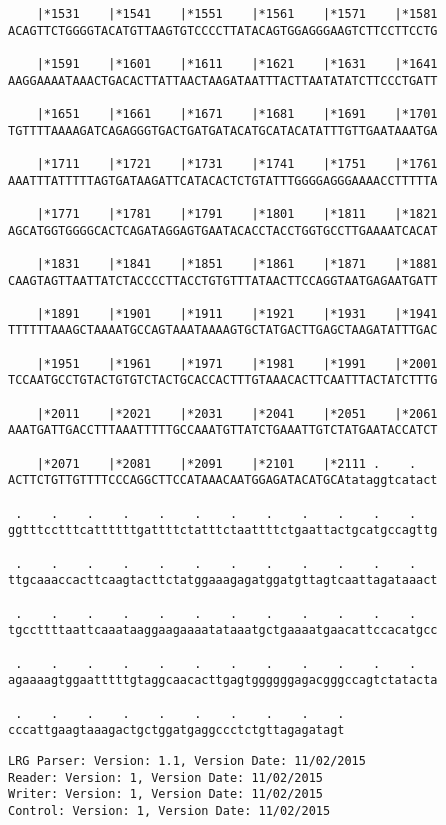 \documentclass{article}
\begin{document}
\begin{Verbatim}
    |*1531    |*1541    |*1551    |*1561    |*1571    |*1581
ACAGTTCTGGGGTACATGTTAAGTGTCCCCTTATACAGTGGAGGGAAGTCTTCCTTCCTG
  
    |*1591    |*1601    |*1611    |*1621    |*1631    |*1641
AAGGAAAATAAACTGACACTTATTAACTAAGATAATTTACTTAATATATCTTCCCTGATT
  
    |*1651    |*1661    |*1671    |*1681    |*1691    |*1701
TGTTTTAAAAGATCAGAGGGTGACTGATGATACATGCATACATATTTGTTGAATAAATGA
  
    |*1711    |*1721    |*1731    |*1741    |*1751    |*1761
AAATTTATTTTTAGTGATAAGATTCATACACTCTGTATTTGGGGAGGGAAAACCTTTTTA
  
    |*1771    |*1781    |*1791    |*1801    |*1811    |*1821
AGCATGGTGGGGCACTCAGATAGGAGTGAATACACCTACCTGGTGCCTTGAAAATCACAT
  
    |*1831    |*1841    |*1851    |*1861    |*1871    |*1881
CAAGTAGTTAATTATCTACCCCTTACCTGTGTTTATAACTTCCAGGTAATGAGAATGATT
  
    |*1891    |*1901    |*1911    |*1921    |*1931    |*1941
TTTTTTAAAGCTAAAATGCCAGTAAATAAAAGTGCTATGACTTGAGCTAAGATATTTGAC
  
    |*1951    |*1961    |*1971    |*1981    |*1991    |*2001
TCCAATGCCTGTACTGTGTCTACTGCACCACTTTGTAAACACTTCAATTTACTATCTTTG
  
    |*2011    |*2021    |*2031    |*2041    |*2051    |*2061
AAATGATTGACCTTTAAATTTTTGCCAAATGTTATCTGAAATTGTCTATGAATACCATCT
  
    |*2071    |*2081    |*2091    |*2101    |*2111 .    .   
ACTTCTGTTGTTTTCCCAGGCTTCCATAAACAATGGAGATACATGCAtataggtcatact
  
 .    .    .    .    .    .    .    .    .    .    .    .   
ggtttcctttcattttttgattttctatttctaattttctgaattactgcatgccagttg
  
 .    .    .    .    .    .    .    .    .    .    .    .   
ttgcaaaccacttcaagtacttctatggaaagagatggatgttagtcaattagataaact
  
 .    .    .    .    .    .    .    .    .    .    .    .   
tgccttttaattcaaataaggaagaaaatataaatgctgaaaatgaacattccacatgcc
  
 .    .    .    .    .    .    .    .    .    .    .    .   
agaaaagtggaatttttgtaggcaacacttgagtggggggagacgggccagtctatacta
  
 .    .    .    .    .    .    .    .    .    .
cccattgaagtaaagactgctggatgaggccctctgttagagatagt
\end{Verbatim}
\newpage
\begin{Verbatim}
LRG Parser: Version: 1.1, Version Date: 11/02/2015
Reader: Version: 1, Version Date: 11/02/2015
Writer: Version: 1, Version Date: 11/02/2015
Control: Version: 1, Version Date: 11/02/2015
\end{Verbatim}
\end{document}
